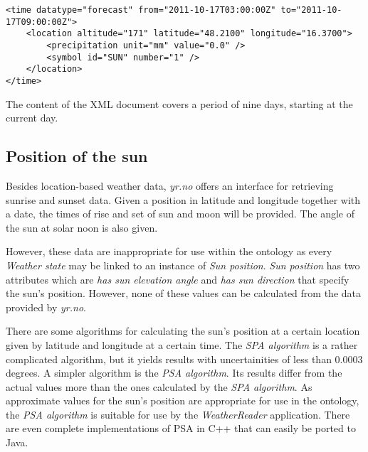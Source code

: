 \begin{lstlisting}
<time datatype="forecast" from="2011-10-17T03:00:00Z" to="2011-10-17T09:00:00Z">
	<location altitude="171" latitude="48.2100" longitude="16.3700">
		<precipitation unit="mm" value="0.0" />
		<symbol id="SUN" number="1" />
	</location>
</time>
\end{lstlisting}

The content of the XML document covers a period of nine days, starting at the current day.

\subsection{Position of the sun}
\label{subsec:sun_position}

Besides location-based weather data, \emph{yr.no} offers an interface for retrieving sunrise and sunset data. Given a position in latitude and longitude together with a date, the times of rise and set of sun and moon will be provided. The angle of the sun at solar noon is also given.

However, these data are inappropriate for use within the \thinkhomeweather ontology as every \emph{Weather state} may be linked to an instance of \emph{Sun position}. \emph{Sun position} has two attributes which are \emph{has sun elevation angle} and \emph{has sun direction} that specify the sun's position. However, none of these values can be calculated from the data provided by \emph{yr.no}.

There are some algorithms for calculating the sun's position at a certain location given by latitude and longitude at a certain time. The \emph{SPA algorithm} is a rather complicated algorithm, but it yields results with uncertainities of less than 0.0003 degrees. A simpler algorithm is the \emph{PSA algorithm}. Its results differ from the actual values more than the ones calculated by the \emph{SPA algorithm}. As approximate values for the sun's position are appropriate for use in the \thinkhomeweather ontology, the \emph{PSA algorithm} is suitable for use by the \emph{WeatherReader} application. There are even complete implementations of PSA in C++ that can easily be ported to Java.
